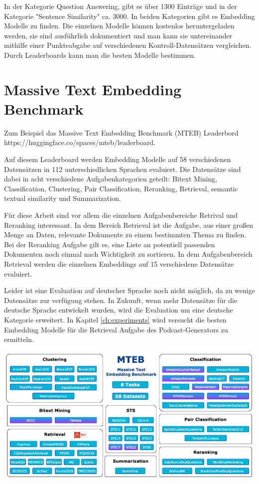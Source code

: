 In der Kategorie Question Answering, gibt es über 1300 Einträge und in der Kategorie "Sentence Similarity" ca. 3000.
In beiden Kategorien gibt es Embedding Modelle zu finden.
Die einzelnen Modelle können  kostenlos heruntergeladen werden, sie sind ausführlich dokumentiert und man kann sie untereinander mithilfe einer Punkteabgabe auf verschiedenen Kontroll-Datensätzen vergleichen.
Durch Leaderboards kann man die besten Modelle bestimmen.

\section{Massive Text Embedding Benchmark}

Zum Beispiel das Massive Text Embedding Benchmark (MTEB) Leaderbord https://huggingface.co/spaces/mteb/leaderboard.

Auf diesem Leaderboard werden Embedding Modelle  auf 58 verschiedenen Datensätzen in 112 unterschiedlichen Sprachen evaluiert.
Die Datensätze sind dabei in acht verschiedene Aufgabenkategorien geteilt:
Bitext Mining, Classification, Clustering, Pair Classification, Reranking, Retrieval, semantic textual similarity und Summarization.

Für diese Arbeit sind vor allem die einzelnen Aufgabenbereiche Retrival und Reranking interessant. In dem Bereich Retrieval ist die Aufgabe, aus einer großen Menge an Daten, relevante Dokumente zu einem bestimmten Thema zu finden.
Bei der Reranking Aufgabe gilt es, eine Liste an potentiell passenden Dokumenten noch einmal nach Wichtigkeit zu sortieren.
In dem Aufgabenbereich Retrieval werden die einzelnen Embeddings auf 15 verschiedene Datensätze evaluiert.

\cite{muennighoff2023}

Leider ist eine Evaluation auf deutscher Sprache noch nicht möglich, da zu wenige Datensätze zur verfügung stehen. 
In Zukunft, wenn mehr Datensätze für die deutsche Sprache entwickelt wurden, wird die Evaluation um eine deutsche Kategorie erweitert. \cite{muennighoff2023a}
In Kapitel \autoref{ch:experiments} wird versucht die besten Embedding Modelle für die Retrieval Aufgabe des Podcast-Generators zu ermitteln.


\includegraphics[width=\linewidth]{figures/mteb.png}



